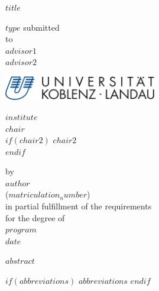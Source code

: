\documentclass[a4paper,11pt]{article}
\begin{document}
\thispagestyle{empty}
\begin{center}
  \vspace*{5mm}
  \linespread{1.5}
  {\huge{\bf $title$}\par}\vspace{1cm}
  $type$ submitted \\\vspace{0.5cm}
  to \\\vspace{0.5cm}
  \textbf{$advisor1$} \\
  \textbf{$advisor2$} \\\vspace{1.5cm}
  
  
  \includegraphics[width=0.5\textwidth]{Uni-Logo-2.jpg}
  
  $institute$ \\
  $chair$ \\
  $if(chair2)$ $chair2$ \\ $endif$ \vspace{1cm}

  
  
  by \\\vspace{0.5cm}
  \textbf{$author$} \\
  ($matriculation_number$) \\
  
  \medskip
  \medskip
  in partial fulfillment of the requirements \\
  for the degree of \\
  \textbf{$program$} \\\vspace{0.5cm}
  $date$
  
\end{center}



\newpage
\tableofcontents
\clearpage

\newpage
$abstract$

$if(abbreviations)$
\newpage
$abbreviations$
$endif$
\end{document}
